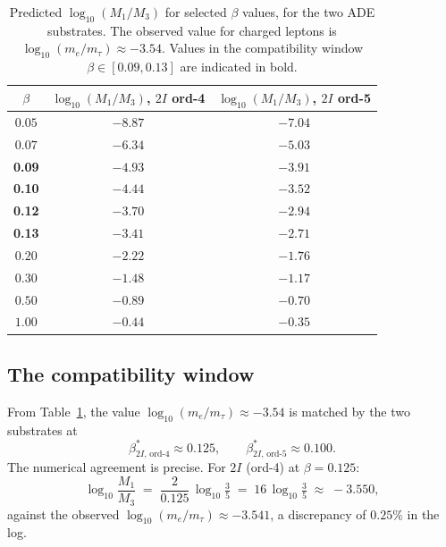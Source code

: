 \documentclass[11pt,a4paper]{article}
\begin{document}
      \begin{table}[ht]
        \centering
        \caption{%
          Predicted $\log_{10}(M_1/M_3)$ for selected $\beta$ values,
          for the two ADE substrates.
          The observed value for charged leptons is
          $\log_{10}(m_e/m_\tau) \approx -3.54$.
          Values in the compatibility window $\beta \in [0.09, 0.13]$
          are indicated in bold.%
        }
        \label{tab:log-ratios}
        \smallskip
        \begin{tabular}{ccc}
          \toprule
          $\beta$ &
          $\log_{10}(M_1/M_3)$, $2I$ ord-4 &
          $\log_{10}(M_1/M_3)$, $2I$ ord-5 \\
          \midrule
          $0.05$        & $-8.87$          & $-7.04$          \\
          $0.07$        & $-6.34$          & $-5.03$          \\
          \textbf{0.09} & $\mathbf{-4.93}$ & $\mathbf{-3.91}$ \\
          \textbf{0.10} & $\mathbf{-4.44}$ & $\mathbf{-3.52}$ \\
          \textbf{0.12} & $\mathbf{-3.70}$ & $\mathbf{-2.94}$ \\
          \textbf{0.13} & $\mathbf{-3.41}$ & $\mathbf{-2.71}$ \\
          $0.20$        & $-2.22$          & $-1.76$          \\
          $0.30$        & $-1.48$          & $-1.17$          \\
          $0.50$        & $-0.89$          & $-0.70$          \\
          $1.00$        & $-0.44$          & $-0.35$          \\
          \bottomrule
        \end{tabular}
      \end{table}

    \subsection{The compatibility window}
      \label{subsec:compatibility-window}

      From Table~\ref{tab:log-ratios}, the value $\log_{10}(m_e/m_\tau) \approx -3.54$
      is matched by the two substrates at
      \begin{equation}
        \label{eq:beta-window-num}
        \beta^{*}_{2I,\,\mathrm{ord\text{-}4}} \approx 0.125,
        \qquad
        \beta^{*}_{2I,\,\mathrm{ord\text{-}5}} \approx 0.100.
      \end{equation}
      The numerical agreement is precise.
      For $2I$ (ord-4) at $\beta = 0.125$:
      \begin{equation}
        \log_{10}\frac{M_1}{M_3}
        \;=\; \frac{2}{0.125}\,\log_{10}\!\tfrac{3}{5}
        \;=\; 16\,\log_{10}\!\tfrac{3}{5}
        \;\approx\; -3.550,
      \end{equation}
      against the observed $\log_{10}(m_e/m_\tau) \approx -3.541$,
      a discrepancy of $0.25\%$ in the log.
\end{document}
